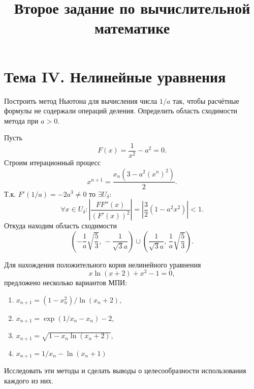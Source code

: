 \documentclass[a4paper]{article}
\title{Второе задание по вычислительной математике}
\begin{document}
	\maketitle
	\section*{Тема IV. Нелинейные уравнения}
\begin{hiProb}[11.3]
Построить метод Ньютона для вычисления числа $1 /a$ так, чтобы
расчётные формулы не содержали операций деления. Определить
область сходимости метода при $a>0$.
\end{hiProb}
\begin{sol}
%
	Пусть
\[
	F(x)= \frac{1}{x^2}-a^2=0
.\] 
Строим итерационный процесс
\[
	x^{n+1}= \frac{x_n \left(3-a^2 (x^n)^2\right)}{2}
.\] 
Т.\:к. $F'(1 /a)=-2a^3\neq 0$ то $\exists U_\delta$:
\[
	\forall x \in U_\delta: \left| \frac{FF''(x)}{(F'(x))^2} \right|= \left| \frac{3}{2}(1-a^2 x^2) \right|  <1
.\]
Откуда находим область сходимости
\[
	\left(-\frac{1}{a} \sqrt{\frac{5}{3}} ,\,-\frac{1}{\sqrt{3} a} \right) \cup \left( \frac{1}{\sqrt{3} a},\, \frac{1}{a}\sqrt{\frac{5}{3}}  \right) 
.\] 
\end{sol}
\begin{hiProb}[11.14]
Для нахождения положительного корня нелинейного уравнения
\[
	x \ln (x+2) +x^2-1=0,
\] 
предложено несколько вариантов МПИ:
\begin{enumerate}
	\item $x_{n+1}=(1-x_n^2) / \ln(x_n+2)$,
	\item $x_{n+1}=\exp (1 /x_n-x_n)-2$,
	\item  $x_{n+1}=\sqrt{1-x_n \ln(x_n+2)} $,
	\item $x_{n+1}= 1 /x_n -\ln (x_n+1)$
\end{enumerate}
Исследовать эти методы
и сделать выводы о целесообразности использования каждого
из них.
\end{hiProb}
\end{document}
